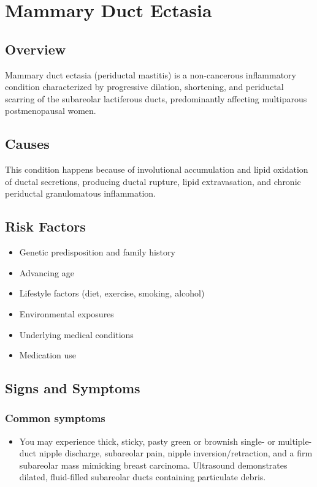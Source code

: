 \chapter{Mammary Duct Ectasia}
\label{sec:Mammary Duct Ectasia}

\section{Overview}
Mammary duct ectasia (periductal mastitis) is a non-cancerous inflammatory condition characterized by progressive dilation, shortening, and periductal scarring of the subareolar lactiferous ducts, predominantly affecting multiparous postmenopausal women.
\section{Causes}
This condition happens because of involutional accumulation and lipid oxidation of ductal secretions, producing ductal rupture, lipid extravasation, and chronic periductal granulomatous inflammation.     
\section{Risk Factors}

\begin{itemize}[noitemsep]
  \item Genetic predisposition and family history
  \item Advancing age
  \item Lifestyle factors (diet, exercise, smoking, alcohol)
  \item Environmental exposures
  \item Underlying medical conditions
  \item Medication use
\end{itemize}
\section{Signs and Symptoms}

\subsection{Common symptoms}
\begin{itemize}[noitemsep]
  \item You may experience thick, sticky, pasty green or brownish single- or multiple-duct nipple discharge, subareolar pain, nipple inversion/retraction, and a firm subareolar mass mimicking breast carcinoma. Ultrasound demonstrates dilated, fluid-filled subareolar ducts containing particulate debris. 
  \end{itemize}

